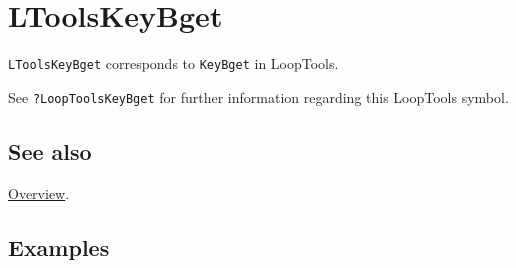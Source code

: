 \documentclass[../FeynHelpersManual.tex]{subfiles}
\begin{document}
\hypertarget{ltoolskeybget}{
\section{LToolsKeyBget}\label{ltoolskeybget}}

\texttt{LToolsKeyBget} corresponds to \texttt{KeyBget} in LoopTools.

See \texttt{?LoopTools\textasciigrave KeyBget} for further information
regarding this LoopTools symbol.

\subsection{See also}

\hyperlink{toc}{Overview}.

\subsection{Examples}
\end{document}
